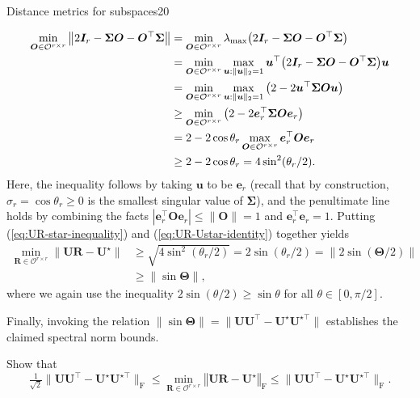 \documentclass{article}
\begin{document}
\begin{problem}{Distance metrics for subspaces}{20}
{%
\begin{align}
\min_{\bm{O}\in\mathcal{O}^{r\times r}}\big\|2\bm{I}_{r}-\bm{\Sigma}\bm{O}-\bm{O}^{\top}\bm{\Sigma}\big\|
	& = \min_{\bm{O}\in\mathcal{O}^{r\times r}}\lambda_{\max} \big( 2\bm{I}_{r}-\bm{\Sigma}\bm{O}-\bm{O}^{\top}\bm{\Sigma}\big) \notag\\
	& =\min_{\bm{O}\in\mathcal{O}^{r\times r}}\max_{\bm{u}:\|\bm{u}\|_{2}=1}\bm{u}^{\top}\big(2\bm{I}_{r}-\bm{\Sigma}\bm{O}-\bm{O}^{\top}\bm{\Sigma}\big)\bm{u}\nonumber \\
 & =\min_{\bm{O}\in\mathcal{O}^{r\times r}}\max_{\bm{u}:\|\bm{u}\|_{2}=1}\big(2-2\bm{u}^{\top}\bm{\Sigma}\bm{O}\bm{u}\big)\nonumber \\
 & \geq\min_{\bm{O}\in\mathcal{O}^{r\times r}}\big(2-2\bm{e}_{r}^{\top}\bm{\Sigma}\bm{O}\bm{e}_{r}\big)\nonumber \\
 & = 2-2\cos\theta_{r}\max_{\bm{O}\in\mathcal{O}^{r\times r}}\bm{e}_{r}^{\top}\bm{O}\bm{e}_{r}\nonumber \\
 & \geq 2-2\cos\theta_{r}
	=4\sin^{2}(\theta_{r}/2).\label{eq:UR-star-inequality}
\end{align}
%
Here, the inequality follows by taking $\bm{u}$ to be $\bm{e}_{r}$
(recall that by construction, $\sigma_{r}=\cos\theta_{r}\geq 0$ is the
smallest singular value of $\bm{\Sigma}$), and the penultimate line
holds by combining the facts $|\bm{e}_{r}^{\top}\bm{O}\bm{e}_{r}|\leq\|\bm{O}\|=1$
and $\bm{e}_{r}^{\top}\bm{e}_{r}=1$. Putting (\ref{eq:UR-star-inequality})
and (\ref{eq:UR-Ustar-identity}) together yields
%
\begin{align*}
\min_{\bm{R}\in\mathcal{O}^{r\times r}}\big\|\bm{U}\bm{R}-\bm{U}^{\star}\big\| & \geq\sqrt{4\sin^{2}(\theta_{r}/2)}=2\sin(\theta_{r}/2)=\|2\sin(\bm{\Theta}/2)\|\nonumber \\
 & \geq\|\sin\bm{\Theta}\|,
\end{align*}
%
where we again use the inequality $2\sin(\theta/2) \geq \sin \theta$ for all $\theta\in [0,\pi/2]$.

Finally, invoking the relation $\|\sin\bm{\Theta}\|=  \|\bm{U}\bm{U}^{\top} - \bm{U}^{\star}\bm{U}^{\star\top}\|$ establishes the claimed spectral norm bounds.






}


 Show that 
\[
\tfrac{1}{\sqrt{2}} \|\bm{U}\bm{U}^{\top} - \bm{U}^{\star}\bm{U}^{\star\top} \|_{\mathrm{F}}
	\leq
	\min_{\bm{R}\in\mathcal{O}^{r\times r}}\left\Vert \bm{U}\bm{R}-\bm{U}^{\star}\right\Vert _{\mathrm{F}}
	\leq \|\bm{U}\bm{U}^{\top} - \bm{U}^{\star}\bm{U}^{\star\top} \|_{\mathrm{F}}.
\] 



\end{problem}
\end{document}
